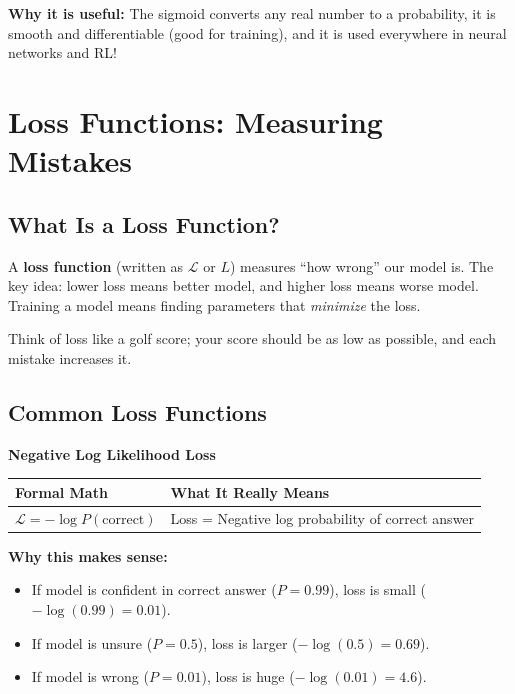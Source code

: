 \begin{chapterenv}
\textbf{Why it is useful:} The sigmoid converts any real number to a probability, it is smooth and differentiable (good for training), and it is used everywhere in neural networks and RL!

\section{Loss Functions: Measuring Mistakes}

\subsection{What Is a Loss Function?}

A \textbf{loss function} (written as $\mathcal{L}$ or $L$) measures ``how wrong'' our model is. The key idea: lower loss means better model, and higher loss means worse model. Training a model means finding parameters that \textit{minimize} the loss.

\begin{tipbox}
Think of loss like a golf score; your score should be as low as possible, and each mistake increases it.
\end{tipbox}

\subsection{Common Loss Functions}

\begin{infobox}
\textbf{Negative Log Likelihood Loss}

\begin{center}
\begin{tabular}{p{}p{}}
\toprule
\textbf{Formal Math} & \textbf{What It Really Means} \\
\midrule
$\mathcal{L} = -\log P(\text{correct})$ & Loss = Negative log probability of correct answer \\
\bottomrule
\end{tabular}
\end{center}

\textbf{Why this makes sense:}
\begin{itemize}[nosep]
    \item If model is confident in correct answer ($P = 0.99$), loss is small ($-\log(0.99) = 0.01$).
    \item If model is unsure ($P = 0.5$), loss is larger ($-\log(0.5) = 0.69$).
    \item If model is wrong ($P = 0.01$), loss is huge ($-\log(0.01) = 4.6$).
\end{itemize}
\end{infobox}


\end{chapterenv}
